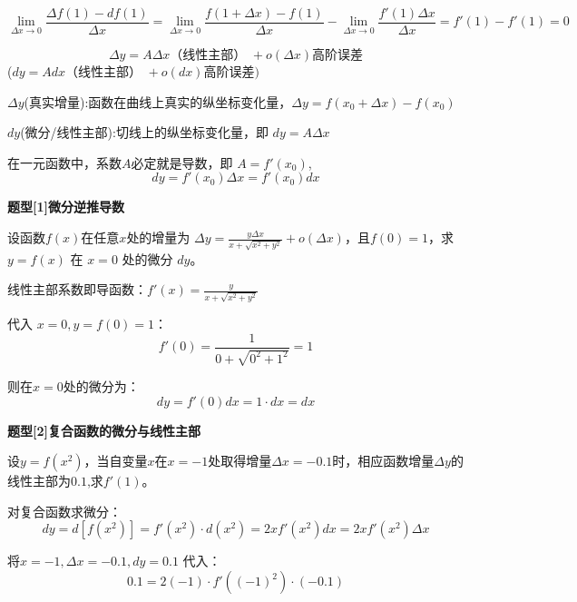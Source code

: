 \documentclass[11pt,a4paper,UTF8]{ctexart}
\begin{document}
\begin{equation*}
\lim_{\Delta x \to 0} \frac{\Delta f(1) - df(1)}{\Delta x} = \lim_{\Delta x \to 0} \frac{f(1+\Delta x) - f(1)}{\Delta x} - \lim_{\Delta x \to 0} \frac{f'(1)\Delta x}{\Delta x} = f'(1) - f'(1) = 0
\end{equation*}
\begin{thmbox}


\begin{equation*}
\Delta y = {A \Delta x}\text{（线性主部） }+ {o(\Delta x)}\text{高阶误差}
\end{equation*}
($dy = {A dx}\text{（线性主部） }+ {o(dx)}\text{高阶误差})$

  $\Delta y$(真实增量):函数在曲线上真实的纵坐标变化量，$\Delta y = f(x_0 + \Delta x) - f(x_0)$

  $dy$(微分/线性主部):切线上的纵坐标变化量，即 $dy = A \Delta x$

  在一元函数中，系数$A$必定就是导数，即 \textit{}$A = f'(x_0)$\textit{},
\begin{equation*}
dy = f'(x_0) \Delta x = f'(x_0) dx
\end{equation*}


\textbf{题型[1]微分逆推导数}

设函数$f(x)$在任意$x$处的增量为 $\Delta y = \frac{y \Delta x}{x + \sqrt{x^2 + y^2}} + o(\Delta x)$，且$f(0) = 1$，求 $y = f(x)$ 在 $x = 0$ 处的微分 $dy$。

  线性主部系数即导函数：$f'(x) = \frac{y}{x + \sqrt{x^2 + y^2}}$

  代入 $x = 0, y = f(0) = 1$：
\begin{equation*}
f'(0) = \frac{1}{0 + \sqrt{0^2 + 1^2}} = 1
\end{equation*}


则在$x = 0$处的微分为：
\begin{equation*}
dy = f'(0) dx = 1 \cdot dx = dx
\end{equation*}


\textbf{题型[2]复合函数的微分与线性主部}

设$y = f(x^2)$，当自变量$x$在$x = -1$处取得增量$\Delta x = -0.1$时，相应函数增量$\Delta y$的线性主部为$0.1$,求$f'(1)$。

  对复合函数求微分：
\begin{equation*}
dy = d[f(x^2)] = f'(x^2) \cdot d(x^2) = 2x f'(x^2) dx = 2x f'(x^2) \Delta x
\end{equation*}


  将$x = -1, \Delta x = -0.1, dy = 0.1$ 	代入：
\begin{equation*}
0.1 = 2(-1) \cdot f'((-1)^2) \cdot (-0.1)
\end{equation*}



\end{thmbox}
\end{document}
